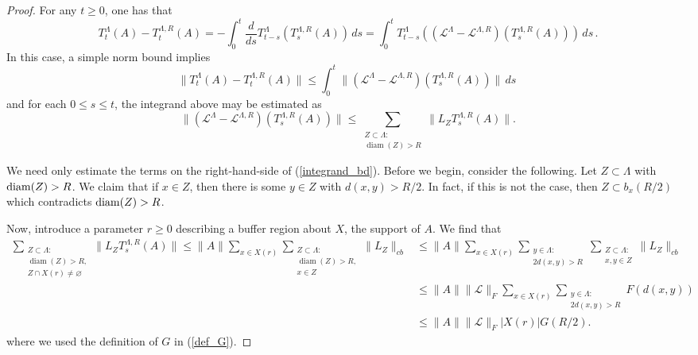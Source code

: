 \documentclass{article}
\DeclareMathOperator{\diam}{diam}
\newcommand{\lind}{\mathscr{L}}
\newcommand{\<}{\langle}
\renewcommand{\>}{\rangle}
\let\emptyset\varnothing
\numberwithin{equation}{section}
\theoremstyle{definition}
\begin{document}
\begin{proof}
 For any $t \geq 0$, one has that
 \begin{equation} \label{dyn_diff}
        T^{\Lambda}_t(A) - T^{\Lambda, R}_t(A) = - \int_0^t \frac{d}{ds}T^{\Lambda}_{t-s}(T^{\Lambda,R}_s(A)) \, ds = \int_0^t T^{\Lambda}_{t-s}\left( (\lind^{\Lambda}-\lind^{\Lambda, R})(T^{\Lambda, R}_s(A))\right) \, ds \, .
  \end{equation}
  In this case, a simple norm bound implies 
    \begin{equation} \label{simple_norm_bd}
              \|T^{\Lambda}_t(A) -T^{\Lambda, R}_t(A) \|  \leq \int_0^t \|( \lind^{\Lambda}-\lind^{\Lambda, R})(T^{\Lambda, R}_s(A))\| \, ds \
    \end{equation}  
and for each $0\le s \le t$, the integrand above may be estimated as 
    \begin{equation} \label{integrand_bd}
        \|( \lind^{\Lambda}-\lind^{\Lambda, R})(T^{\Lambda, R}_s(A))\|\le \sum_{\substack{Z\subset \Lambda: \\ \diam(Z)> R}} \|L_Z T^{\Lambda, R}_s(A)\|.
    \end{equation}

We need only estimate the terms on the right-hand-side of (\ref{integrand_bd}). 
Before we begin, consider the following. Let $Z \subset \Lambda$ with ${\rm diam}(Z) >R$. We claim that if $x \in Z$, then
    there is some $y \in Z$ with $d(x,y) > R/2$. In fact, if this is not the case, then $Z \subset b_x(R/2)$ which contradicts ${\rm diam}(Z) >R$.
    
Now, introduce a parameter $r\ge 0$ describing a buffer region about $X$, the support of $A$. We find that
    \begin{align*}
        \sum_{\substack{Z\subset \Lambda:\\ \diam(Z)> R,\\ Z\cap X(r)\neq \emptyset}} \|L_ZT^{\Lambda, R}_s(A) \| \le \|A\| \sum_{x\in X(r)} \sum_{\substack{Z\subset \Lambda :\\ \diam(Z)> R,\\ x\in Z}} \|L_Z\|_{cb} &\le \|A\| \sum_{x\in X(r)} \sum_{\substack{y\in \Lambda:\\ 2d(x,y)>R}} \sum_{\substack{Z\subset \Lambda:\\ x,y\in Z}}\|L_Z\|_{cb}\\
        &\le \|A\| \|\mathscr{L}\|_F \sum_{x\in X(r)} \sum_{\substack{y\in \Lambda:\\ 2d(x,y)>R}} F(d(x,y)) \\
        & \le  \|A\| \|\mathscr{L}\|_F |X(r)| G(R/2).
    \end{align*} 
where we used the definition of $G$ in (\ref{def_G}).     


\end{proof}
\end{document}
